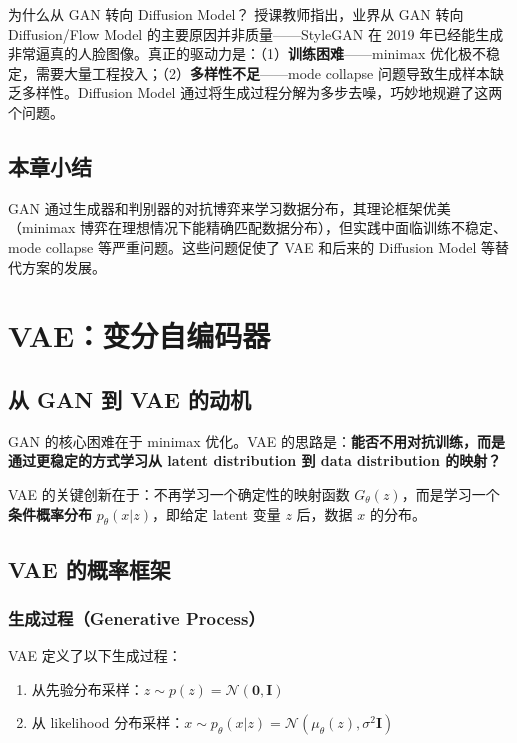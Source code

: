 \documentclass[a4paper]{article}
\begin{document}
\begin{knowledgebox}{为什么从 GAN 转向 Diffusion Model？}
授课教师指出，业界从 GAN 转向 Diffusion/Flow Model 的主要原因并非质量——StyleGAN 在 2019 年已经能生成非常逼真的人脸图像。真正的驱动力是：（1）\textbf{训练困难}——minimax 优化极不稳定，需要大量工程投入；（2）\textbf{多样性不足}——mode collapse 问题导致生成样本缺乏多样性。Diffusion Model 通过将生成过程分解为多步去噪，巧妙地规避了这两个问题。
\end{knowledgebox}

\subsection{本章小结}

GAN 通过生成器和判别器的对抗博弈来学习数据分布，其理论框架优美（minimax 博弈在理想情况下能精确匹配数据分布），但实践中面临训练不稳定、mode collapse 等严重问题。这些问题促使了 VAE 和后来的 Diffusion Model 等替代方案的发展。

\newpage
\section{VAE：变分自编码器}

\subsection{从 GAN 到 VAE 的动机}

GAN 的核心困难在于 minimax 优化。VAE 的思路是：\textbf{能否不用对抗训练，而是通过更稳定的方式学习从 latent distribution 到 data distribution 的映射？}

VAE 的关键创新在于：不再学习一个确定性的映射函数 $G_\theta(z)$，而是学习一个\textbf{条件概率分布} $p_\theta(x|z)$，即给定 latent 变量 $z$ 后，数据 $x$ 的分布。

\subsection{VAE 的概率框架}

\subsubsection{生成过程（Generative Process）}

VAE 定义了以下生成过程：

\begin{enumerate}
    \item 从先验分布采样：$z \sim p(z) = \mathcal{N}(\mathbf{0}, \mathbf{I})$
    \item 从 likelihood 分布采样：$x \sim p_\theta(x|z) = \mathcal{N}(\mu_\theta(z), \sigma^2 \mathbf{I})$
\end{enumerate}
\end{document}
